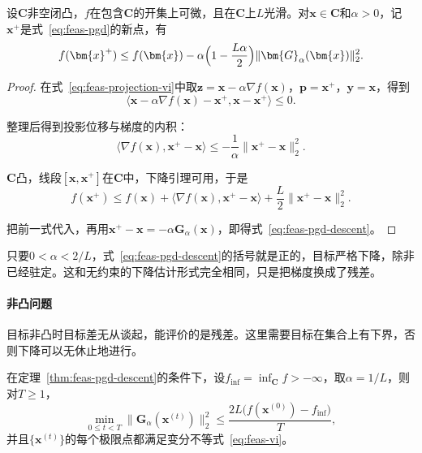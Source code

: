 \begin{theorem}[投影梯度的单步下降]
\label{thm:feas-pgd-descent}
设$\bm{C}$非空闭凸，$f$在包含$\bm{C}$的开集上可微，且在$\bm{C}$上$L$光滑。对$\bm{x}\in\bm{C}$和$\alpha>0$，记$\bm{x}^{+}$是式~\eqref{eq:feas-pgd}的新点，有
\begin{equation}
 f(\bm{x}^{+})\leq f(\bm{x})-\alpha\Bigl(1-\frac{L\alpha}{2}\Bigr)\lVert\bm{G}_\alpha(\bm{x})\rVert_2^2.
 \label{eq:feas-pgd-descent}
\end{equation}
\end{theorem}

\begin{proof}
在式~\eqref{eq:feas-projection-vi}中取$\bm{z}=\bm{x}-\alpha\nabla f(\bm{x})$，$\bm{p}=\bm{x}^{+}$，$\bm{y}=\bm{x}$，得到
\[
 \langle\bm{x}-\alpha\nabla f(\bm{x})-\bm{x}^{+},\bm{x}-\bm{x}^{+}\rangle\leq0.
\]

整理后得到投影位移与梯度的内积：
\[
 \langle\nabla f(\bm{x}),\bm{x}^{+}-\bm{x}\rangle\leq-\frac1\alpha\lVert\bm{x}^{+}-\bm{x}\rVert_2^2.
\]

$\bm{C}$凸，线段$[\bm{x},\bm{x}^{+}]$在$\bm{C}$中，下降引理可用，于是
\[
 f(\bm{x}^{+})\leq f(\bm{x})+\langle\nabla f(\bm{x}),\bm{x}^{+}-\bm{x}\rangle+\frac L2\lVert\bm{x}^{+}-\bm{x}\rVert_2^2.
\]

把前一式代入，再用$\bm{x}^{+}-\bm{x}=-\alpha\bm{G}_\alpha(\bm{x})$，即得式~\eqref{eq:feas-pgd-descent}。
\end{proof}

只要$0<\alpha<2/L$，式~\eqref{eq:feas-pgd-descent}的括号就是正的，目标严格下降，除非已经驻定。这和无约束的下降估计形式完全相同，只是把梯度换成了残差。

\paragraph{非凸问题}
目标非凸时目标差无从谈起，能评价的是残差。这里需要目标在集合上有下界，否则下降可以无休止地进行。

\begin{theorem}[非凸情形的投影梯度]
\label{thm:feas-pgd-nonconvex}
在定理~\ref{thm:feas-pgd-descent}的条件下，设$f_{\inf}=\inf_{\bm{C}}f>-\infty$，取$\alpha=1/L$，则对$T\geq1$，
\begin{equation}
 \min_{0\leq t<T}\lVert\bm{G}_\alpha(\bm{x}^{(t)})\rVert_2^2\leq\frac{2L\bigl(f(\bm{x}^{(0)})-f_{\inf}\bigr)}{T},
 \label{eq:feas-pgd-nonconvex}
\end{equation}
并且$\{\bm{x}^{(t)}\}$的每个极限点都满足变分不等式~\eqref{eq:feas-vi}。
\end{theorem}


